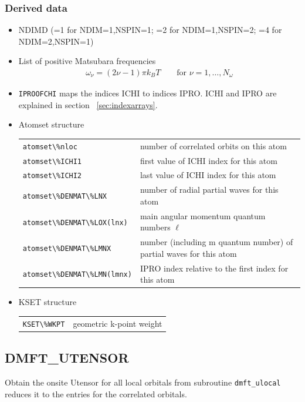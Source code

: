 \documentclass[11pt,a4paper]{report}
\begin{document}
\subsubsection{Derived data}
\begin{itemize}
\item NDIMD (=1 for NDIM=1,NSPIN=1; =2 for NDIM=1,NSPIN=2; =4 for
  NDIM=2,NSPIN=1)
\item List of positive Matsubara frequencies
\begin{eqnarray}
\omega_\nu=(2\nu-1)\pi k_BT \qquad\text{for $\nu=1,\ldots,N_\omega$}
\end{eqnarray}
\item \verb|IPROOFCHI| maps the indices ICHI to indices IPRO. ICHI and
  IPRO are explained in section ~\ref{sec:indexarrays}.
\item Atomset structure
\begin{center}
 \begin{tabular}{ll}
 \verb|atomset\%nloc| & number of correlated orbits on this atom \\
\verb|atomset\%ICHI1| & first value of ICHI index for this atom\\
\verb|atomset\%ICHI2| & last value of ICHI index for this atom\\
\verb|atomset\%DENMAT\%LNX| & number of radial partial waves  for this atom\\
\verb|atomset\%DENMAT\%LOX(lnx)| 
     & main angular momentum quantum numbers $\ell$\\
\verb|atomset\%DENMAT\%LMNX| 
     & number (including m quantum number) of partial waves  for this atom\\
\verb|atomset\%DENMAT\%LMN(lmnx)| 
     & IPRO index relative to the first index for this atom\\
\end{tabular}
\end{center}
%
\item KSET structure
\begin{center}
 \begin{tabular}{ll}
 \verb|KSET\%WKPT| & geometric k-point weight\\
\end{tabular}
\end{center}
\end{itemize}

\subsection{DMFT\_UTENSOR}
Obtain the onsite Utensor for all local orbitals from subroutine
\verb|dmft_ulocal| reduces it to the entries for the correlated
orbitals.
\end{document}
